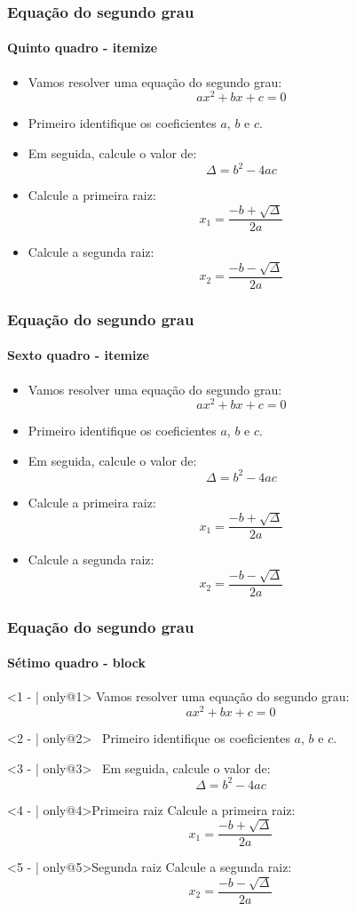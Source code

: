 \documentclass[aspectratio=169]{beamer}
\begin{document}
	\begin{frame}
		\frametitle{Equação do segundo grau}
		\framesubtitle{Quinto quadro - itemize}
		
		\begin{itemize}
			\item<1- | alert@1> Vamos resolver uma equação do segundo grau:
			$$ax^2 + bx + c = 0$$			
			\item<2- | alert@2> Primeiro identifique os coeficientes $a$, $b$ e $c$.			
			\item<3- | alert@3> Em seguida, calcule o valor de: 
			$$\Delta = b^2 - 4ac$$			
			\item<4- | alert@4> Calcule a primeira raiz:
			$$x_1 = \dfrac{-b + \sqrt{\Delta}}{2a}$$			
			\item<5- | alert@5> Calcule a segunda raiz:
			$$x_2 = \dfrac{-b - \sqrt{\Delta}}{2a}$$
		\end{itemize}		
	\end{frame}	
	\begin{frame}
		\frametitle{Equação do segundo grau}
		\framesubtitle{Sexto quadro - itemize}
		
		\begin{itemize}[<+- | alert@+>]
			\item Vamos resolver uma equação do segundo grau:
			$$ax^2 + bx + c = 0$$			
			\item Primeiro identifique os coeficientes $a$, $b$ e $c$.			
			\item Em seguida, calcule o valor de: 
			$$\Delta = b^2 - 4ac$$			
			\item Calcule a primeira raiz:
			$$x_1 = \dfrac{-b + \sqrt{\Delta}}{2a}$$			
			\item Calcule a segunda raiz:
			$$x_2 = \dfrac{-b - \sqrt{\Delta}}{2a}$$
		\end{itemize}		
	\end{frame}
	\begin{frame}
		\frametitle{Equação do segundo grau}
		\framesubtitle{Sétimo quadro - block}
		
		\begin{block}<1 - | only@1>{}		
			Vamos resolver uma equação do segundo grau:
			$$ax^2 + bx + c = 0$$
		\end{block}
		
		\begin{block}<2 - | only@2>{\ }
			Primeiro identifique os coeficientes $a$, $b$ e $c$.
		\end{block}
		
		\begin{block}<3 - | only@3>{\ }
			Em seguida, calcule o valor de: 
			$$\Delta = b^2 - 4ac$$
		\end{block}
		
		\begin{block}<4 - | only@4>{Primeira raiz}
			Calcule a primeira raiz:
			$$x_1 = \dfrac{-b + \sqrt{\Delta}}{2a}$$
		\end{block}
		
		\begin{block}<5 - | only@5>{Segunda raiz}
			Calcule a segunda raiz:
			$$x_2 = \dfrac{-b - \sqrt{\Delta}}{2a}$$
		\end{block}
	\end{frame}
\end{document}
